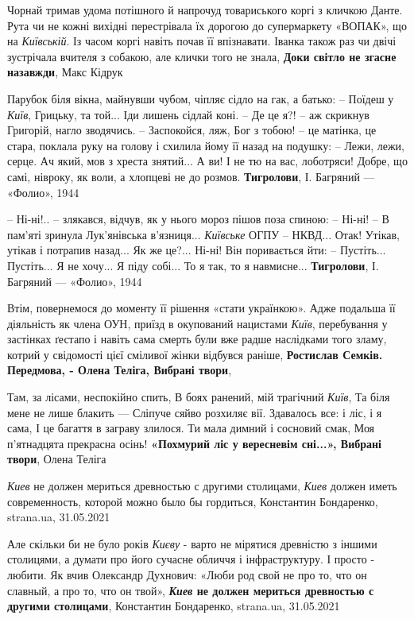 Чорнай тримав удома потішного й напрочуд товариського коргі з кличкою Данте.
Рута чи не кожні вихідні перестрівала їх дорогою до супермаркету «ВОПАК», що на
\emph{Київській}. Із часом коргі навіть почав її впізнавати. Іванка також раз
чи двічі зустрічала вчителя з собакою, але клички того не знала, \textbf{Доки
світло не згасне назавжди}, Макс Кідрук

Парубок біля вікна, майнувши чубом, чіпляє сідло на гак, а батько:
– Поїдеш у \emph{Київ}, Грицьку, та той... Іди лишень сідлай коні.
– Де це я?! – аж скрикнув Григорій, нагло зводячись.
– Заспокойся, ляж, Бог з тобою! – це матінка, це стара, поклала руку на голову і схилила
йому її назад на подушку: – Лежи, лежи, серце. Ач який, мов з хреста знятий... А ви! І не тю на вас, лоботряси! Добре, що самі, нівроку, як воли, а хлопцеві не до розмов.
\textbf{Тигролови}, І. Багряний — «Фолио», 1944

– Ні-ні!.. – злякався, відчув, як у нього мороз пішов поза спиною: – Ні-ні! – В
пам’яті зринула Лук’янівська в’язниця... \emph{Київське} ОГПУ – НКВД... Отак!
Утікав, утікав і потрапив назад... Як же це?... Ні-ні! Він поривається йти: –
Пустіть... Пустіть... Я не хочу... Я піду собі... То я так, то я навмисне...
\textbf{Тигролови}, І. Багряний — «Фолио», 1944

Втім, повернемося до моменту її рішення «стати українкою». Адже подальша її
діяльність як члена ОУН, приїзд в окупований нацистами \emph{Київ}, перебування
у застінках ґестапо і навіть сама смерть були вже радше наслідками того зламу,
котрий у свідомості цієї сміливої жінки відбувся раніше, \textbf{Ростислав
Семків. Передмова, - Олена Теліга, Вибрані твори},

Там, за лісами, неспокійно спить,
В боях ранений, мій трагічний \emph{Київ},
Та біля мене не лише блакить —
Сліпуче сяйво розхиляє вії.
Здавалось все: і ліс, і я сама,
І це багаття в заграву злилося.
Ти мала димний і сосновий смак,
Моя п’ятнадцята прекрасна осінь!
\textbf{«Похмурий ліс у вересневім сні...», Вибрані твори}, Олена Теліга


\emph{Киев} не должен мериться древностью с другими столицами, \emph{Киев}
должен иметь современность, которой можно было бы гордиться, Константин
Бондаренко, strana.ua, 31.05.2021

Але скільки би не було років \emph{Києву} - варто не мірятися древністю з
іншими столицями, а думати про його сучасне обличчя і інфраструктуру. І просто
- любити. Як вчив Олександр Духнович: «Люби род свой не про то, что он славный,
а про то, что он твой», \textbf{\emph{Киев} не должен мериться древностью с
другими столицами}, Константин Бондаренко, strana.ua, 31.05.2021

